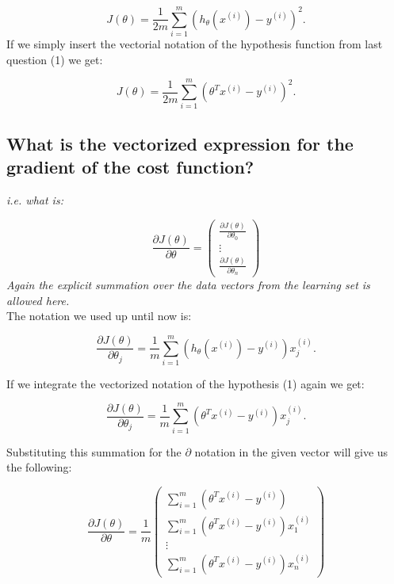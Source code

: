 \documentclass{article}
\begin{document}
	\begin{equation*}
			J(\theta) = \frac{1}{2m} \sum\limits_{i=1}^m (h _{\theta} (x ^{(i)}) - y ^{(i)})^2.
	\end{equation*}
	If we simply insert the vectorial notation of the hypothesis function from last question (1) we get:
	
	\begin{equation*}
			J(\theta) = \frac{1}{2m} \sum\limits_{i=1}^m (\theta^T x^{(i)} - y ^{(i)})^2.
	\end{equation*}

\subsection{What is the vectorized expression for the gradient of the cost function?}
\textit{i.e. what is:}

\begin{equation*}
\frac{\partial J(\theta)}{\partial \theta} = \begin{pmatrix} \frac{\partial J(\theta)}{\partial \theta_0} \\ \vdots \\ \frac{\partial J(\theta)}{\partial \theta_n} \end{pmatrix}
\end{equation*}
\textit{Again the explicit summation over the data vectors from the
learning set is allowed here.}\\
	
	The notation we used up until now is:
	
	\begin{equation*}
	\frac{\partial J(\theta)}{\partial \theta_j}= \frac{1}{m} \sum\limits_{i=1}^m (h _{\theta} (x ^{(i)}) - y ^{(i)})x_j^{(i)}.
	\end{equation*}
	
	If we integrate the vectorized notation of the hypothesis (1) again we get:
	
	\begin{equation*}
	\frac{\partial J(\theta)}{\partial \theta_j}= \frac{1}{m} \sum\limits_{i=1}^m ( \theta^T x^{(i)}  - y ^{(i)})x_j^{(i)}.
	\end{equation*}
	
	Substituting this summation for the $\partial$ notation in the given vector will give us the following:
	
	\begin{equation}
	\frac{\partial J(\theta)}{\partial \theta} = \frac{1}{m}\begin{pmatrix}	\sum\limits_{i=1}^m ( \theta^T x^{(i)}  - y ^{(i)})\\ 
										     		\sum\limits_{i=1}^m ( \theta^T x^{(i)}  - y ^{(i)})x_1^{(i)} \\ 
											      	 \vdots \\
											 	\sum\limits_{i=1}^m ( \theta^T x^{(i)}  - y ^{(i)})x_n^{(i)}
							\end{pmatrix}
	\end{equation}
\end{document}
